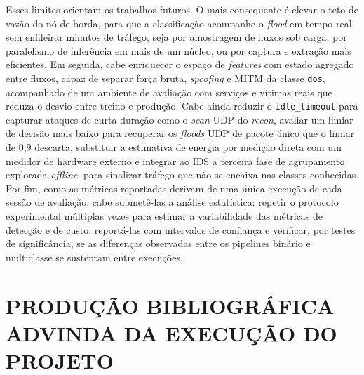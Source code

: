 \documentclass[12pt,a4paper]{article}
\begin{document}
Esses limites orientam os trabalhos futuros. O mais consequente é elevar o teto de
vazão do nó de borda, para que a classificação acompanhe o \textit{flood} em tempo
real sem enfileirar minutos de tráfego, seja por amostragem de fluxos sob carga,
por paralelismo de inferência em mais de um núcleo, ou por captura e extração mais
eficientes. Em seguida, cabe enriquecer o espaço de \textit{features} com estado
agregado entre fluxos, capaz de separar força bruta, \textit{spoofing} e MITM da
classe \texttt{dos}, acompanhado de um ambiente de avaliação com serviços e
vítimas reais que reduza o desvio entre treino e produção. Cabe ainda reduzir o
\texttt{idle\_timeout} para capturar ataques de curta duração como o \textit{scan}
UDP do \textit{recon}, avaliar um limiar de decisão mais baixo para recuperar os
\textit{floods} UDP de pacote único que o limiar de 0,9 descarta, substituir a
estimativa de energia por medição direta com um medidor de hardware externo e
integrar ao IDS a terceira fase de agrupamento explorada \textit{offline}, para
sinalizar tráfego que não se encaixa nas classes conhecidas. Por fim, como as
métricas reportadas derivam de uma única execução de cada sessão de avaliação,
cabe submetê-las a análise
estatística: repetir o protocolo experimental múltiplas vezes para estimar a
variabilidade das métricas de detecção e de custo, reportá-las com intervalos
de confiança e verificar, por testes de significância, se as diferenças
observadas entre os pipelines binário e multiclasse se sustentam entre
execuções.




\section{PRODUÇÃO BIBLIOGRÁFICA ADVINDA DA EXECUÇÃO DO PROJETO}
\label{sec:producao}
\end{document}
